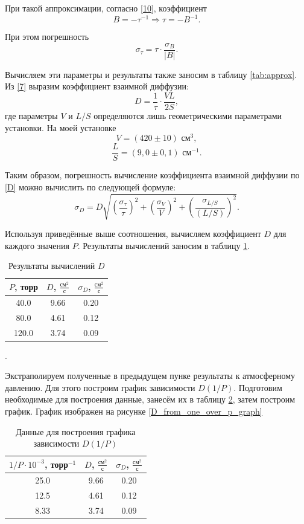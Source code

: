 \documentclass[a4paper, 12pt]{article}
\newcounter{Points}
\newcommand{\point}{\arabic{Points}. \addtocounter{Points}{1}}
\begin{document}
При такой аппроксимации, согласно \eqref{10}, коэффициент 
\[ B = -\tau^{-1} \Rightarrow \tau = -B^{-1}. \]

При этом погрешность
\[ \sigma_\tau = \tau \cdot \frac{\sigma_{B}}{|B|}. \]

Вычисляем эти параметры и результаты также заносим в таблицу \ref{tab:approx}. Из \eqref{7} выразим коэффициент взаимной диффузии: \begin{equation}\label{D}
 D = \frac{1}{\tau}\cdot\frac{VL}{2S},
\end{equation} где параметры $ V $ и $ L/S $ определяются лишь геометрическими параметрами установки. На моей установке \[ V = (420\pm 10) \text{ см}^3,\] \[ \frac{L}{S} = (9,0 \pm 0,1) \text{ см}^{-1}. \]

Таким образом, погрешность вычисление коэффициента взаимной диффузии по \eqref{D} можно вычислить по следующей формуле:
\[ \sigma_D = D\sqrt{\left(\frac{\sigma_\tau}{\tau}\right)^2+\left(\frac{\sigma_V}{V}\right)^2+\left(\frac{\sigma_{L/S}}{(L/S)}\right)^2}. \]

Используя приведённые выше соотношения, вычисляем коэффициент $ D $ для каждого значения $ P $. Результаты вычислений заносим в таблицу \ref{tab:Dres}.

\begin{table}[H]
	\centering
	\begin{tabular}{|c|c|c|}
		\hline
		$ P $, торр & $ D $, $ \frac{\text{см}^2}{\text{с}} $ & $ \sigma_D $, $ \frac{\text{см}^2}{\text{с}} $ \\ \hline
		40.0 & 9.66 & 0.20 \\ \hline
		80.0 & 4.61 & 0.12 \\ \hline
		120.0 & 3.74 & 0.09 \\ \hline
	\end{tabular}
	\caption{Результаты вычислений $D$}
	\label{tab:Dres}
\end{table}

\point Экстраполируем полученные в предыдущем пунке результаты к атмосферному давлению. Для этого построим график зависимости $ D(1/P) $. Подготовим необходимые для построения данные, занесём их в таблицу \ref{tab:data}, затем построим график. График изображен на рисунке \ref{D_from_one_over_p_graph}

\begin{table}[H]
	\centering
	\begin{tabular}{|c|c|c|}
		\hline
		$ 1/P \cdot 10^{-3} $, торр$ ^{-1} $ & $ D $, $ \frac{\text{см}^2}{\text{с}} $ & $ \sigma_D $, $ \frac{\text{см}^2}{\text{с}} $ \\ \hline
		25.0 & 9.66 & 0.20 \\ \hline
		12.5 & 4.61 & 0.12 \\ \hline
		8.33 & 3.74 & 0.09 \\ \hline
	\end{tabular}
	\caption{Данные для построения графика зависимости $D(1/P)$}
	\label{tab:data}
\end{table}
\end{document}
